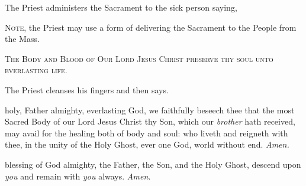 \begin{rubric}
    The Priest administers the Sacrament to the sick person saying,\par
    \textsc{Note,} the Priest may use a form of delivering the Sacrament to the People from the Mass.
\end{rubric}
\begin{center}
    \textsc{The Body and Blood of Our Lord Jesus Christ preserve thy soul unto everlasting life.}
\end{center}
\begin{rubric}
    The Priest cleanses his fingers and then says.
\end{rubric}
{} holy, Father almighty, everlasting God, we faithfully beseech thee that the most Sacred Body of our Lord Jesus Christ thy Son, which our \textit{brother} hath received, may avail for the healing both of body and soul: who liveth and reigneth with thee, in the unity of the Holy Ghost, ever one God, world without end. \textit{Amen.}

 blessing of God almighty, the Father, {} the Son, and the Holy Ghost, descend upon \textit{you} and remain with \textit{you} always. \textit{Amen.}

